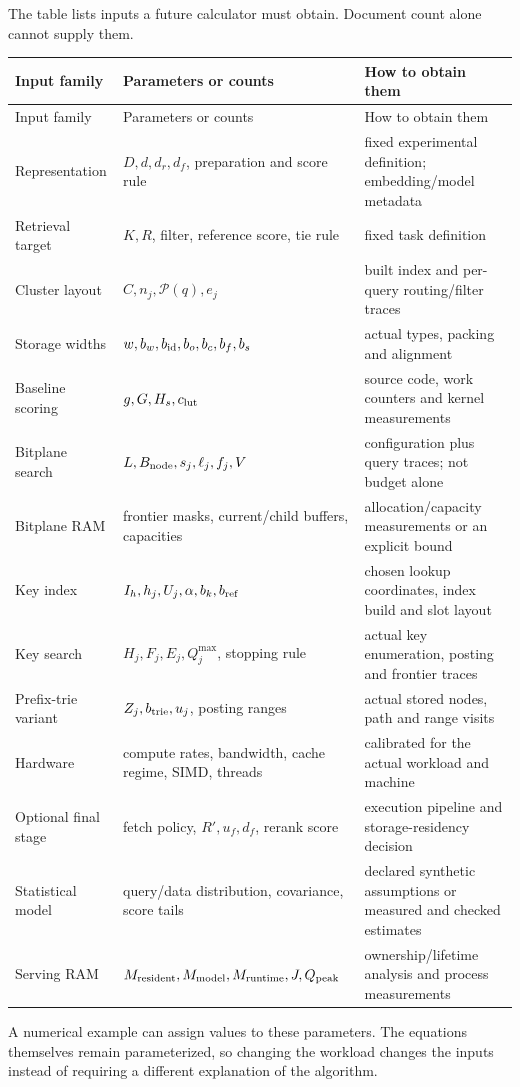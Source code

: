 The table lists inputs a future calculator must obtain. Document count alone cannot supply them.
\small
\begin{longtable}{@{}P{.25\linewidth}P{.35\linewidth}P{.33\linewidth}@{}}
\toprule Input family & Parameters or counts & How to obtain them\\\midrule\endfirsthead
\toprule Input family & Parameters or counts & How to obtain them\\\midrule\endhead
Representation & $D,d,d_r,d_f$, preparation and score rule & fixed experimental definition; embedding/model metadata\\
Retrieval target & $K,R$, filter, reference score, tie rule & fixed task definition\\
Cluster layout & $C,n_j,\mathcal P(q),e_j$ & built index and per-query routing/filter traces\\
Storage widths & $w,b_w,b_{\rm id},b_o,b_c,b_f,b_s$ & actual types, packing and alignment\\
Baseline scoring & $g,G,H_s,c_{\rm lut}$ & source code, work counters and kernel measurements\\
Bitplane search & $L,B_{\rm node},s_j,\ell_j,f_j,V$ & configuration plus query traces; not budget alone\\
Bitplane RAM & frontier masks, current/child buffers, capacities & allocation/capacity measurements or an explicit bound\\
Key index & $I_h,h_j,U_j,\alpha,b_k,b_{\rm ref}$ & chosen lookup coordinates, index build and slot layout\\
Key search & $H_j,F_j,E_j,Q_j^{\max}$, stopping rule & actual key enumeration, posting and frontier traces\\
Prefix-trie variant & $Z_j,b_{\rm trie},u_j$, posting ranges & actual stored nodes, path and range visits\\
Hardware & compute rates, bandwidth, cache regime, SIMD, threads & calibrated for the actual workload and machine\\
Optional final stage & fetch policy, $R',u_f,d_f$, rerank score & execution pipeline and storage-residency decision\\
Statistical model & query/data distribution, covariance, score tails & declared synthetic assumptions or measured and checked estimates\\
Serving RAM & $M_{\rm resident},M_{\rm model},M_{\rm runtime},J,Q_{\rm peak}$ & ownership/lifetime analysis and process measurements\\\bottomrule
\end{longtable}
\normalsize
A numerical example can assign values to these parameters. The equations themselves remain
parameterized, so changing the workload changes the inputs instead of requiring a different
explanation of the algorithm.

